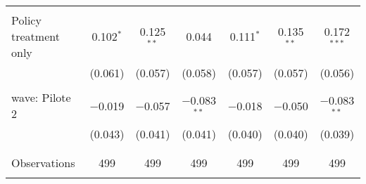 \begin{tabular}{@{\extracolsep{5pt}}lcccccc}
  & & & & & & \\ 
 Policy treatment only & 0.102$^{*}$ & 0.125$^{**}$ & 0.044 & 0.111$^{*}$ & 0.135$^{**}$ & 0.172$^{***}$ \\ 
  & (0.061) & (0.057) & (0.058) & (0.057) & (0.057) & (0.056) \\ 
  & & & & & & \\ 
 wave: Pilote 2 & $-$0.019 & $-$0.057 & $-$0.083$^{**}$ & $-$0.018 & $-$0.050 & $-$0.083$^{**}$ \\ 
  & (0.043) & (0.041) & (0.041) & (0.040) & (0.040) & (0.039) \\ 
  & & & & & & \\ 
\hline \\[-1.8ex] 

Observations & 499 & 499 & 499 & 499 & 499 & 499 \\ 
\hline 
\hline \\[-1.8ex] 
\end{tabular} 